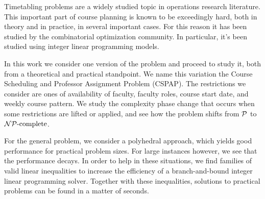 Timetabling problems are a widely studied topic in operations research literature. This important part of course planning is known to be exceedingly hard, both in theory and in practice, in several important cases. For this reason it has been studied by the combinatorial optimization community. In particular, it's been studied using integer linear programming models.

In this work we consider one version of the problem and proceed to study it, both from a theoretical and practical standpoint. We name this variation the Course Scheduling and Professor Assignment Problem (CSPAP). The restrictions we consider are ones of availability of faculty, faculty roles, course start date, and weekly course pattern. We study the complexity phase change that occurs when some restrictions are lifted or applied, and see how the problem shifts from $\mathcal{P}$ to $\mathcal{NP}{\text{-complete}}$.

For the general problem, we consider a polyhedral approach, which yields good performance for practical problem sizes. For large instances however, we see that the performance decays. In order to help in these situations, we find families of valid linear inequalities to increase the efficiency of a branch-and-bound integer linear programming solver. Together with these inequalities, solutions to practical problems can be found in a matter of seconds.
